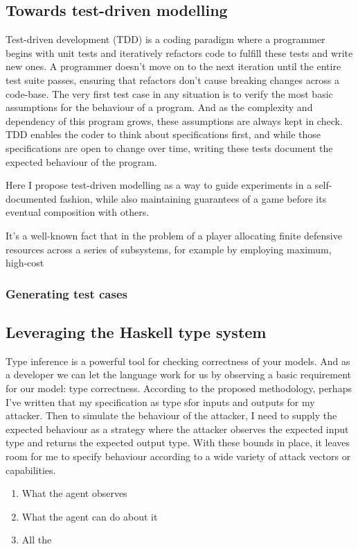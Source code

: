 \subsection{Towards test-driven modelling}
Test-driven development (TDD) is a coding paradigm where a programmer begins with unit tests and iteratively refactors code to fulfill these tests and write new ones. A programmer doesn't move on to the next iteration until the entire test suite passes, ensuring that refactors don't cause breaking changes across a code-base. The very first test case in any situation is to verify the most basic assumptions for the behaviour of a program. And as the complexity and dependency of this program grows, these assumptions are always kept in check. TDD enables the coder to think about specifications first, and while those specifications are open to change over time, writing these tests document the expected behaviour of the program. 

Here I propose test-driven modelling as a way to guide experiments in a self-documented fashion, while also maintaining guarantees of a game before its eventual composition with others. 

It's a well-known fact that in the problem of a player allocating finite defensive resources across a series of subsystems, for example by employing maximum, high-cost 


\subsubsection{Generating test cases}

\subsection{Leveraging the Haskell type system}
\label{sec: types}
Type inference is a powerful tool for checking correctness of your models. And as a developer we can let the language work for us by observing a basic requirement for our model: type correctness. According to the proposed methodology, perhaps I've written that my specification as type sfor inputs and outputs for my attacker. Then to simulate the behaviour of the attacker, I need to supply the expected behaviour as a strategy where the attacker observes the expected input type and returns the expected output type. With these bounds in place, it leaves room for me to specify behaviour according to a wide variety of attack vectors or capabilities. 
\begin{enumerate}
	\item What the agent observes
	\item What the agent can do about it 
	\item All the 
\end{enumerate}


